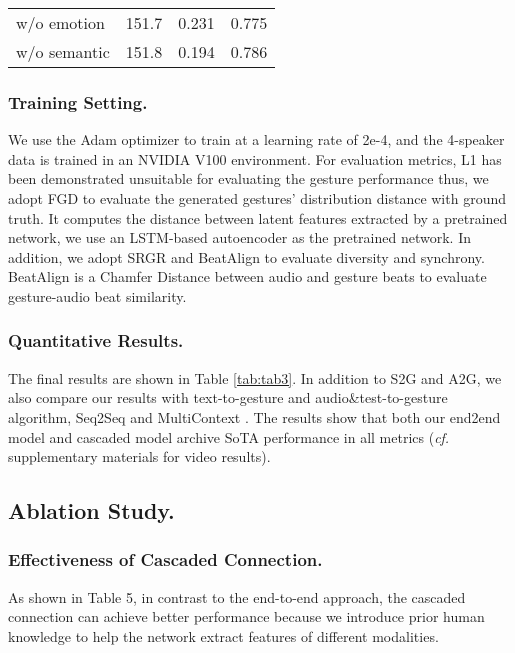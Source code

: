 \documentclass[runningheads]{llncs}
\begin{document}
\begin{table}
\begin{minipage}{\textwidth}
\begin{minipage}[t]{0.50\textwidth}
{\begin{tabular}{lccc}
w/o emotion    & 151.7     & 0.231              &  0.775              \\
w/o semantic   & 151.8     &\cellcolor[rgb]{0.963,0.81,0.81}   0.194          &   0.786               
\end{tabular}}
\end{minipage}
\end{minipage}
\end{table} \subsubsection{Training Setting.} We use the Adam optimizer \cite{kingma2014adam} to train at a learning rate of 2e-4, and the 4-speaker data is trained in an NVIDIA V100 environment. For evaluation metrics, L1 has been demonstrated unsuitable for evaluating the gesture performance  \cite{li2021audio2gestures,yoon2020speech} thus, we adopt FGD \cite{yoon2020speech} to evaluate the generated gestures' distribution distance with ground truth. It computes the distance between latent features extracted by a pretrained network, we use an LSTM-based autoencoder as the pretrained network. In addition, we adopt SRGR and BeatAlign to evaluate diversity and synchrony. 
BeatAlign \cite{li2021ai} is a Chamfer Distance between audio and gesture beats to evaluate gesture-audio beat similarity.


\vspace{-0.5cm}
\subsubsection{Quantitative Results.} The final results are shown in Table \ref{tab:tab3}. In addition to S2G and A2G, we also compare our results with text-to-gesture and audio\&test-to-gesture algorithm, Seq2Seq \cite{yoon2019robots} and MultiContext \cite{yoon2020speech}. The results show that both our end2end model and cascaded model archive SoTA performance in all metrics (\textit{cf.} supplementary materials for video results). 

\subsection{Ablation Study.}
\subsubsection{Effectiveness of Cascaded Connection.} As shown in Table 5, in contrast to the end-to-end approach, the cascaded connection can achieve better performance because we introduce prior human knowledge to help the network extract features of different modalities. 
\end{document}
